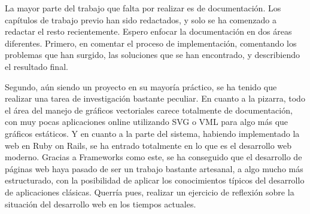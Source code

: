 \documentclass [11pt]{article}
\begin{document}
La mayor parte del trabajo que falta por realizar es de documentación. Los capítulos de trabajo previo han sido redactados, y solo se ha comenzado a redactar el resto recientemente. Espero enfocar la documentación en dos áreas diferentes. Primero, en comentar el proceso de implementación, comentando los problemas que han surgido, las soluciones que se han encontrado, y describiendo el resultado final.

Segundo, aún siendo un proyecto en su mayoría práctico, se ha tenido que realizar una tarea de investigación bastante peculiar. En cuanto a la pizarra, todo el área del manejo de gráficos vectoriales carece totalmente de documentación, con muy pocas aplicaciones online utilizando SVG o VML para algo más que gráficos estáticos. Y en cuanto a la parte del sistema, habiendo implementado la web en Ruby on Rails, se ha entrado totalmente en lo que es el desarrollo web moderno. Gracias a Frameworks como este, se ha conseguido que el desarrollo de páginas web haya pasado de ser un trabajo bastante artesanal, a algo mucho más estructurado, con la posibilidad de aplicar los conocimientos típicos del desarrollo de aplicaciones clásicas. Querría pues, realizar un ejercicio de reflexión sobre la situación del desarrollo web en los tiempos actuales.
\end{document}

